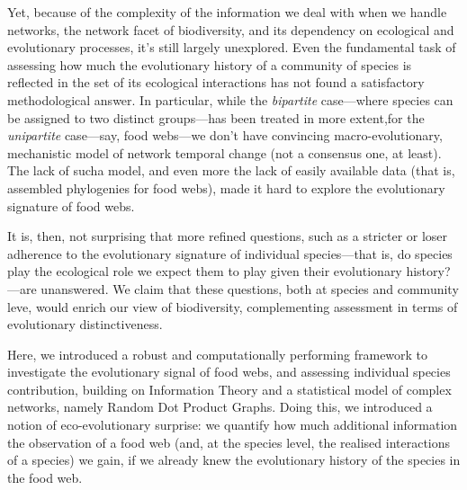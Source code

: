 \documentclass[11pt]{article}
\begin{document}
Yet, because of the complexity of the information we deal with when we
handle networks, the network facet of biodiversity, and its dependency
on ecological and evolutionary processes, it's still largely unexplored.
Even the fundamental task of assessing how much the evolutionary history
of a community of species is reflected in the set of its ecological
interactions has not found a satisfactory methodological answer. In
particular, while the \emph{bipartite} case---where species can be
assigned to two distinct groups---has been treated in more extent,for
the \emph{unipartite} case---say, food webs---we don't have convincing
macro-evolutionary, mechanistic model of network temporal change (not a
consensus one, at least). The lack of sucha model, and even more the
lack of easily available data (that is, assembled phylogenies for food
webs), made it hard to explore the evolutionary signature of food webs.

It is, then, not surprising that more refined questions, such as a
stricter or loser adherence to the evolutionary signature of individual
species---that is, do species play the ecological role we expect them to
play given their evolutionary history?---are unanswered. We claim that
these questions, both at species and community leve, would enrich our
view of biodiversity, complementing assessment in terms of evolutionary
distinctiveness.

Here, we introduced a robust and computationally performing framework to
investigate the evolutionary signal of food webs, and assessing
individual species contribution, building on Information Theory and a
statistical model of complex networks, namely Random Dot Product Graphs.
Doing this, we introduced a notion of eco-evolutionary surprise: we
quantify how much additional information the observation of a food web
(and, at the species level, the realised interactions of a species) we
gain, if we already knew the evolutionary history of the species in the
food web.
\end{document}
